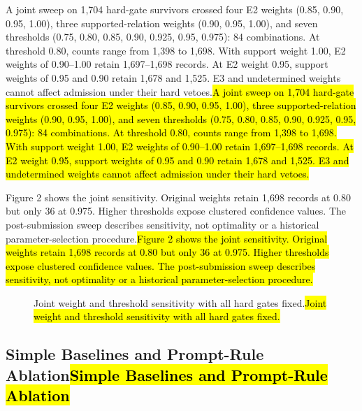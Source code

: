 \documentclass[conference,a4paper]{IEEEtran}
\DeclareRobustCommand{\rev}[1]{\ifdefined\CleanVersion#1\else\hl{#1}\fi}
\begin{document}
\rev{A joint sweep on 1,704 hard-gate survivors crossed four E2 weights (0.85, 0.90, 0.95, 1.00), three supported-relation weights (0.90, 0.95, 1.00), and seven thresholds (0.75, 0.80, 0.85, 0.90, 0.925, 0.95, 0.975): 84 combinations. At threshold 0.80, counts range from 1,398 to 1,698. With support weight 1.00, E2 weights of 0.90--1.00 retain 1,697--1,698 records. At E2 weight 0.95, support weights of 0.95 and 0.90 retain 1,678 and 1,525. E3 and undetermined weights cannot affect admission under their hard vetoes.}

\rev{Figure 2 shows the joint sensitivity. Original weights retain 1,698 records at 0.80 but only 36 at 0.975. Higher thresholds expose clustered confidence values. The post-submission sweep describes sensitivity, not optimality or a historical parameter-selection procedure.}

\begin{figure}[t]
\centering
\colorbox{revisionfigure}{%
}
\caption{\rev{Joint weight and threshold sensitivity with all hard gates fixed.}}
\label{fig:threshold}
\end{figure}

\subsection{\rev{Simple Baselines and Prompt-Rule Ablation}}
\end{document}
